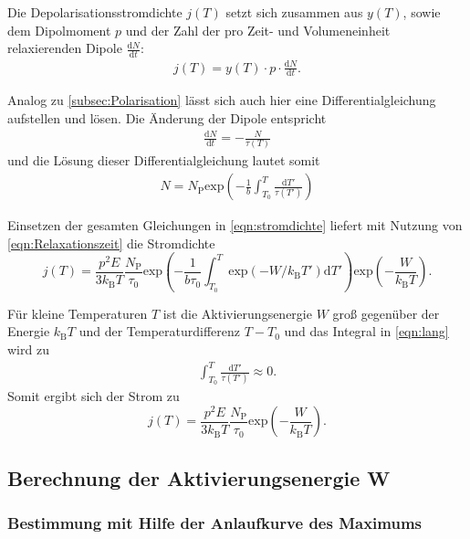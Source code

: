Die Depolarisationsstromdichte $j(T)$ setzt sich zusammen aus $y(T)$, sowie dem Dipolmoment $p$ und der Zahl der pro Zeit- und Volumeneinheit 
relaxierenden Dipole $\frac{\text{d}N}{\text{d}t}$:
\begin{align}
    j(T) = y(T) \cdot p \cdot \frac{\text{d}N}{\text{d}t}.
    \label{eqn:stromdichte}
\end{align}

Analog zu \autoref{subsec:Polarisation} lässt sich auch hier eine Differentialgleichung aufstellen und lösen.
Die Änderung der Dipole entspricht
\begin{align}
    \frac{\text{d} N}{\text{d} t} = -\frac{N}{\tau(T)}
\end{align}
und die Lösung dieser Differentialgleichung lautet somit 
\begin{align}
    N = N_\text{P} \text{exp}\left(-\frac{1}{b}\int_{T_0}^T\frac{\text{d}T'}{\tau(T')}\right)
\end{align}

Einsetzen der gesamten Gleichungen in \autoref{eqn:stromdichte} liefert mit Nutzung von \autoref{eqn:Relaxationszeit} die Stromdichte
\begin{equation}
  j(T) = \frac{p^2E}{3k_\text{B}T}\frac{N_\text{P}}{\tau_0}\text{exp}\left(-\frac{1}{b\tau_0}\int_{T_0}^T\text{exp}(-W/ k_ \text{B}T')\text{d}T'\right)\text{exp}\left(-\frac{W}{k_\text{B}T}\right).
 \label{eqn:lang}
\end{equation}

Für kleine Temperaturen $T$ ist die Aktivierungsenergie $W$ groß gegenüber der Energie $k_\text{B}T$ und der Temperaturdifferenz $T-T_0$ und das Integral in \autoref{eqn:lang} wird zu
\begin{align}
    \int_{T_0}^T\frac{\text{d}T'}{\tau(T')} \approx 0.
\end{align}
Somit ergibt sich der Strom zu
\begin{equation}
    j(T) = \frac{p^2E}{3k_\text{B}T}\frac{N_\text{P}}{\tau_0} \text{exp}\left(-\frac{W}{k_\text{B}T}\right).
    \label{eqn:kurz}
\end{equation}


\subsection{Berechnung der Aktivierungsenergie W}
\label{subsec:Aktivierungsenergie}

\subsubsection{Bestimmung mit Hilfe der Anlaufkurve des Maximums}

